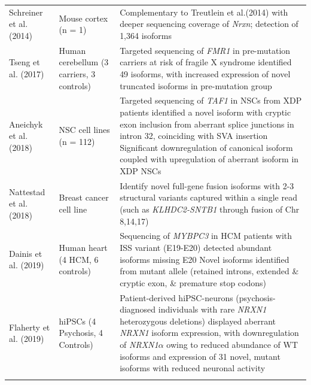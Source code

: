 \begin{changemargin}{1.5cm}
\begin{landscape}
\begin{longtable}[c]{p{4cm}p{4cm}p{18cm}}
			\centering Schreiner et al. (2014)\cite{Schreiner2014} &
			\centering Mouse cortex (n = 1) &
			\tabitem Complementary to Treutlein et al.(2014) with deeper sequencing coverage of \textit{Nrxn}; detection of 1,364 isoforms\\
			\hdashline[0.5pt/5pt]
			
			\centering Tseng et al. (2017) \cite{Tseng2017} &
			\centering Human cerebellum \newline (3 carriers, 3 controls)  &
			\tabitem Targeted sequencing of \textit{FMR1} in pre-mutation carriers at risk of fragile X syndrome identified 49 isoforms, with increased expression of novel truncated isoforms in pre-mutation group \\
			\hdashline[0.5pt/5pt]	
			
			\centering Aneichyk et al.(2018) \cite{Aneichyk2018} &
			\centering NSC cell lines (n = 112)  &
			\tabitem Targeted sequencing of \textit{TAF1} in NSCs from XDP patients identified a novel isoform with cryptic exon inclusion from aberrant splice junctions in intron 32, coinciding with SVA insertion \newline
			\tabitem Significant downregulation of canonical isoform coupled with upregulation of aberrant isoform in XDP NSCs\\
			\hdashline[0.5pt/5pt]	
			
			\centering Nattestad et al. (2018) \cite{Nattestad2018} &
			\centering Breast cancer cell line  &
			\tabitem Identify novel full-gene fusion isoforms with 2-3 structural variants captured within a single read (such as \textit{KLHDC2-SNTB1} through fusion of Chr 8,14,17) \\			
			
			\centering Dainis et al. (2019) \cite{Dainis2019} &
			\centering Human heart (4 HCM, 6 controls) &
			\tabitem Sequencing of \textit{MYBPC3} in HCM patients with ISS variant (E19-E20) detected abundant isoforms missing E20 \newline
			\tabitem Novel isoforms identified from mutant allele (retained introns, extended \& cryptic exon, \& premature stop codons)  \\
			\hdashline[0.5pt/5pt]	
			
			\centering Flaherty et al. (2019) \cite{Flaherty2019} &
			\centering hiPSCs \newline (4 Psychosis, 4 Controls)  &
			\tabitem Patient-derived hiPSC-neurons (psychosis-diagnosed individuals with rare \textit{NRXN1} heterozygous deletions) displayed aberrant \textit{NRXN1} isoform expression, with downregulation of \textit{NRXN1$\alpha$} owing to reduced abundance of WT isoforms and expression of 31 novel, mutant isoforms with reduced neuronal activity  \\
			\hdashline[0.5pt/5pt]
			

\end{longtable}
\end{landscape}
\end{changemargin}
